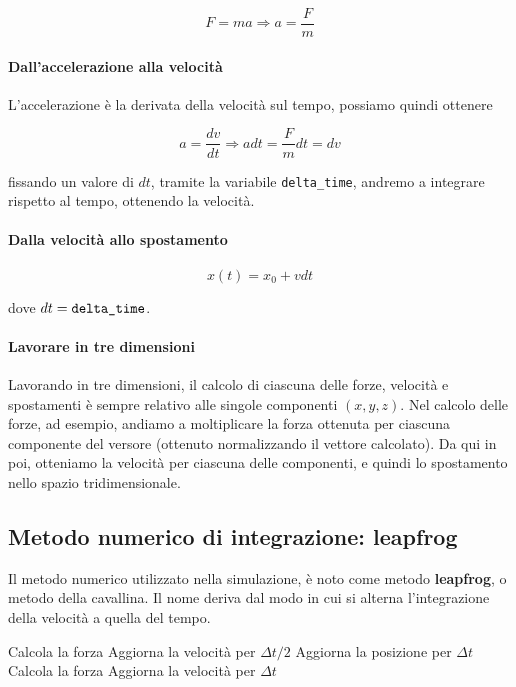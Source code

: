 \documentclass{article}
\begin{document}
	$$
	F = ma \Rightarrow a = \frac{F}{m}
	$$
	
	\paragraph{Dall'accelerazione alla velocità} L'accelerazione è la derivata della velocità sul tempo, possiamo quindi ottenere
	
	$$
	a = \frac{dv}{dt} \Rightarrow adt = \frac{F}{m}dt = dv
	$$
	
	fissando un valore di $dt$, tramite la variabile \verb*|delta_time|, andremo a integrare rispetto al tempo, ottenendo la velocità.
	
	\paragraph{Dalla velocità allo spostamento}
	
	$$
	x(t) = x_0 + v dt
	$$
	
	dove $dt = \verb*|delta_time|$.
	
	\paragraph{Lavorare in tre dimensioni} Lavorando in tre dimensioni, il calcolo di ciascuna delle forze, velocità e spostamenti è sempre relativo alle singole componenti $(x,y,z)$. Nel calcolo delle forze, ad esempio, andiamo a moltiplicare la forza ottenuta per ciascuna componente del versore (ottenuto normalizzando il vettore calcolato). Da qui in poi, otteniamo la velocità per ciascuna delle componenti, e quindi lo spostamento nello spazio tridimensionale.
	
	
	\subsection{Metodo numerico di integrazione: leapfrog}
	Il metodo numerico utilizzato nella simulazione, è noto come metodo \textbf{leapfrog}, o metodo della cavallina. Il nome deriva dal modo in cui si alterna l'integrazione della velocità a quella del tempo.
	
	\begin{algorithm}
		\caption{Integrazione Leapfrog}
		\begin{algorithmic}[1]
		\State Calcola la forza
		\State Aggiorna la velocità per $\Delta t/2$
			\State Aggiorna la posizione per $\Delta t$
			\State Calcola la forza
			\State Aggiorna la velocità per $\Delta t$
		\EndFor
		\end{algorithmic}
	\end{algorithm}
	
\end{document}
